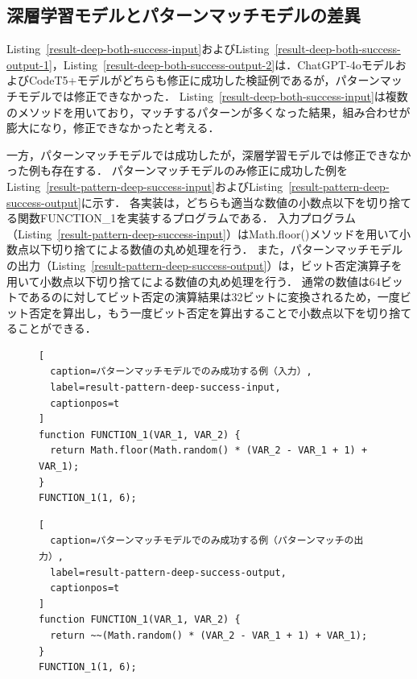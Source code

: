 \documentclass[11pt]{jreport}
\begin{document}


\subsection{深層学習モデルとパターンマッチモデルの差異}


Listing~\ref{result-deep-both-success-input}およびListing~\ref{result-deep-both-success-output-1}，Listing~\ref{result-deep-both-success-output-2}は．ChatGPT-4oモデルおよびCodeT5+モデルがどちらも修正に成功した検証例であるが，パターンマッチモデルでは修正できなかった．
Listing~\ref{result-deep-both-success-input}は複数のメソッドを用いており，マッチするパターンが多くなった結果，組み合わせが膨大になり，修正できなかったと考える．

一方，パターンマッチモデルでは成功したが，深層学習モデルでは修正できなかった例も存在する．
パターンマッチモデルのみ修正に成功した例をListing~\ref{result-pattern-deep-success-input}およびListing~\ref{result-pattern-deep-success-output}に示す．
各実装は，どちらも適当な数値の小数点以下を切り捨てる関数FUNCTION\_1を実装するプログラムである．
入力プログラム（Listing~\ref{result-pattern-deep-success-input}）はMath.floor()メソッドを用いて小数点以下切り捨てによる数値の丸め処理を行う．
また，パターンマッチモデルの出力（Listing~\ref{result-pattern-deep-success-output}）は，ビット否定演算子を用いて小数点以下切り捨てによる数値の丸め処理を行う．
通常の数値は64ビットであるのに対してビット否定の演算結果は32ビットに変換されるため，一度ビット否定を算出し，もう一度ビット否定を算出することで小数点以下を切り捨てることができる．



\begin{figure}[t]
\captionsetup{name=Listing}
\hspace{0.04\columnwidth}
\begin{minipage}[b]{0.96\linewidth}
\begin{lstlisting}[
  caption=パターンマッチモデルでのみ成功する例（入力）,
  label=result-pattern-deep-success-input,
  captionpos=t
]
function FUNCTION_1(VAR_1, VAR_2) {
  return Math.floor(Math.random() * (VAR_2 - VAR_1 + 1) + VAR_1);
}
FUNCTION_1(1, 6);
\end{lstlisting}
\end{minipage}

\hspace{0.04\columnwidth}
\begin{minipage}[b]{0.96\linewidth}
\begin{lstlisting}[
  caption=パターンマッチモデルでのみ成功する例（パターンマッチの出力）,
  label=result-pattern-deep-success-output,
  captionpos=t
]
function FUNCTION_1(VAR_1, VAR_2) {
  return ~~(Math.random() * (VAR_2 - VAR_1 + 1) + VAR_1);
}
FUNCTION_1(1, 6);
\end{lstlisting}
\end{minipage}
\end{figure}
\end{document}
